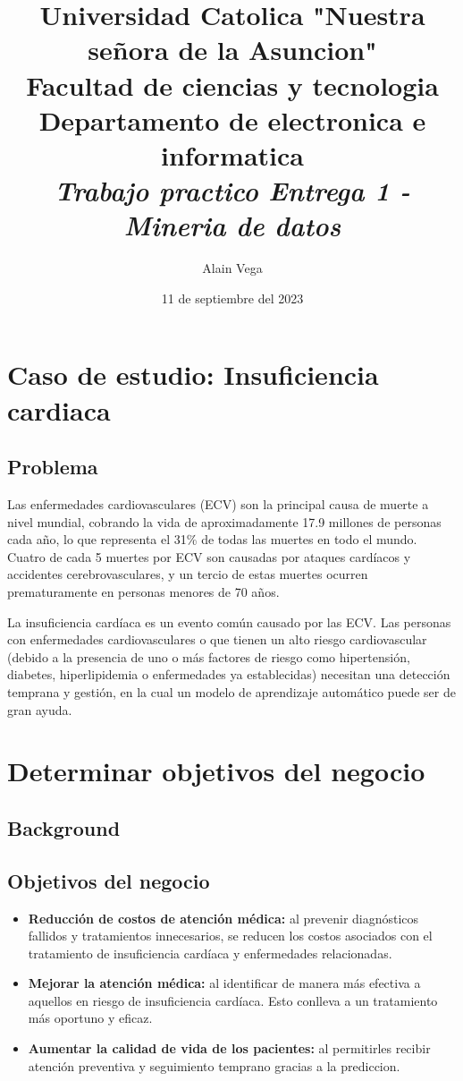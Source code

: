 \documentclass[12pt, letterpaper, spanish]{article}
\title{\textbf{Universidad Catolica "Nuestra señora de la Asuncion" \\ 
[1ex] \large Facultad de ciencias y tecnologia \\ 
Departamento de electronica e informatica \\
\textit{Trabajo practico Entrega 1 - Mineria de datos}}}
\author{Alain Vega}
\date{11 de septiembre del 2023}
\begin{document}
\maketitle

\newpage
\tableofcontents %
\newpage

\section{Caso de estudio: Insuficiencia cardiaca}
\subsection{Problema}
Las enfermedades cardiovasculares (ECV) son la principal causa de muerte a nivel mundial, 
cobrando la vida de aproximadamente 17.9 millones de personas cada año, 
lo que representa el 31\% de todas las muertes en todo el mundo. 
Cuatro de cada 5 muertes por ECV son causadas por ataques cardíacos y accidentes cerebrovasculares, 
y un tercio de estas muertes ocurren prematuramente en personas menores de 70 años. 

La insuficiencia cardíaca es un evento común causado por las ECV.
Las personas con enfermedades cardiovasculares o que tienen un alto riesgo cardiovascular 
(debido a la presencia de uno o más factores de riesgo como hipertensión, diabetes, 
hiperlipidemia o enfermedades ya establecidas) necesitan una detección temprana y gestión, 
en la cual un modelo de aprendizaje automático puede ser de gran ayuda.
\section{Determinar objetivos del negocio}
\subsection{Background}

\subsection{Objetivos del negocio}
  \begin{itemize}
    \item{\textbf{Reducción de costos de atención médica: }
    al prevenir diagnósticos fallidos y tratamientos innecesarios, se reducen los costos
    asociados con el tratamiento de insuficiencia cardíaca y enfermedades relacionadas.}
    \item{\textbf{Mejorar la atención médica:} 
    al identificar de manera más efectiva a aquellos en riesgo de insuficiencia cardíaca. 
    Esto conlleva a un tratamiento más oportuno y eficaz.}
    \item{\textbf{Aumentar la calidad de vida de los pacientes:} 
    al permitirles recibir atención preventiva y seguimiento temprano gracias a la prediccion.}
  \end{itemize}
\end{document}
